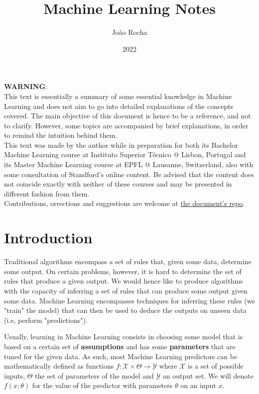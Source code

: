 \documentclass{article}
\title{Machine Learning Notes}
\date{2022}
\author{João Rocha}
\begin{document}
\maketitle
\tableofcontents
\vspace*{\fill}
\textbf{WARNING}:\\ 
This text is essentially a summary of some essential knowledge in Machine Learning and does not aim to go into detailed explanations of the concepts covered.
The main objective of this document is hence to be a reference, and not to clarify.
However, some topics are accompanied by brief explanations, in order to remind the intuition behind them.\\
This text was made by the author while in preparation for both its Bachelor Machine Learning course at Instituto Superior Técnico @ Lisbon, Portugal and its Master Machine Learning course at EPFL @ Lausanne, Switzerland, also with some consultation of Standford's online content.
Be advised that the content does not coincide exactly with neither of these courses and may be presented in different fashion from them.\\
Contributions, orrections and suggestions are welcome at \href{https://github.com/Calhau18/Machine_Learning_Notes}{the document's repo}.
\newpage

\section{Introduction}

Traditional algorithms encompass a set of rules that, given some data, determine some output.
On certain problems, however, it is hard to determine the set of rules that produce a given output.
We would hence like to produce algorithms with the capacity of inferring a set of rules that can produce some output given some data.
Machine Learning encompasses techniques for inferring these rules (we "train" the model) that can then be used to deduce the outputs on unseen data (i.e, perform "predictions").

Usually, learning in Machine Learning consists in choosing some model that is based on a certain set of \textbf{assumptions} and has some \textbf{parameters} that are tuned for the given data.
As such, most Machine Learning predictors can be mathematically defined as functions $f : \mathcal{X} \times \Theta \to \mathcal{Y}$ where $\mathcal{X}$ is a set of possible inputs, $\Theta$ the set of parameters of the model and $\mathcal{Y}$ an output set.
We will denote $f(x ; \theta)$ for the value of the predictor with parameters $\theta$ on an input $x$.
\end{document}
